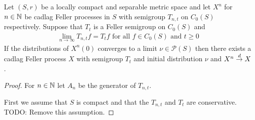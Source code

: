 \begin{thm}\label{KurtzMackevicius}Let $(S,r)$ be a locally compact and separable metric space and let $X^n$ for $n \in \mathbb{N}$ be
cadlag Feller processes in $S$ with semigroup $T_{n,t}$ on $C_0(S)$ respectively.  Suppose that $T_t$ is a Feller semigroup on $C_0(S)$ and
\begin{align*}
\lim_{n \to \infty} T_{n,t} f = T_t f \text{ for all $f \in C_0(S)$ and $t \geq 0$}
\end{align*}
If the distributions of $X^n(0)$ converges to a limit $\nu \in \mathcal{P}(S)$ then there exists a cadlag Feller process $X$ with semigroup
$T_t$ and initial distribution $\nu$ and $X^n \overset{d}\to X$.
\end{thm} 
\begin{proof}
For $n \in \mathbb{N}$ let $A_n$ be the generator of $T_{n,t}$.

First we assume that $S$ is compact and that the $T_{n,t}$ and $T_t$ are conservative.  TODO: Remove this assumption.


\end{proof}
